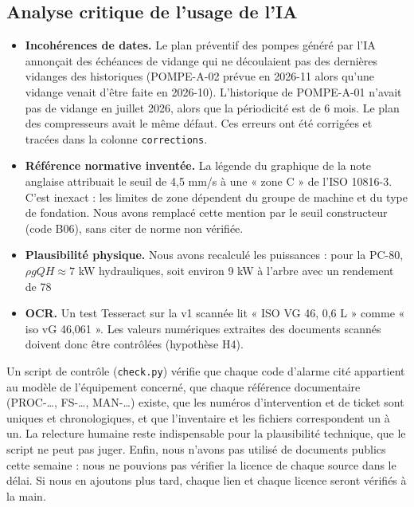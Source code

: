 \documentclass[11pt,a4paper]{article}
\begin{document}
\subsection{Analyse critique de l'usage de l'IA}
\begin{alerte}
\begin{itemize}
\item \textbf{Incohérences de dates.} Le plan préventif des pompes généré par l'IA annonçait des échéances de vidange qui ne découlaient pas des dernières vidanges des historiques (POMPE-A-02 prévue en 2026-11 alors qu'une vidange venait d'être faite en 2026-10). L'historique de POMPE-A-01 n'avait pas de vidange en juillet 2026, alors que la périodicité est de 6 mois. Le plan des compresseurs avait le même défaut. Ces erreurs ont été corrigées et tracées dans la colonne \texttt{corrections}.
\item \textbf{Référence normative inventée.} La légende du graphique de la note anglaise attribuait le seuil de 4,5 mm/s à une « zone C » de l'ISO 10816-3. C'est inexact : les limites de zone dépendent du groupe de machine et du type de fondation. Nous avons remplacé cette mention par le seuil constructeur (code B06), sans citer de norme non vérifiée.
\item \textbf{Plausibilité physique.} Nous avons recalculé les puissances : pour la PC-80, $\rho g Q H \approx 7$ kW hydrauliques, soit environ 9 kW à l'arbre avec un rendement de 78 %
\item \textbf{OCR.} Un test Tesseract sur la v1 scannée lit « ISO VG 46, 0,6 L » comme « iso vG 46,061 ». Les valeurs numériques extraites des documents scannés doivent donc être contrôlées (hypothèse H4).
\end{itemize}
\end{alerte}
Un script de contrôle (\texttt{check.py}) vérifie que chaque code d'alarme cité appartient au modèle de l'équipement concerné, que chaque référence documentaire (PROC-…, FS-…, MAN-…) existe, que les numéros d'intervention et de ticket sont uniques et chronologiques, et que l'inventaire et les fichiers correspondent un à un. La relecture humaine reste indispensable pour la plausibilité technique, que le script ne peut pas juger. Enfin, nous n'avons pas utilisé de documents publics cette semaine : nous ne pouvions pas vérifier la licence de chaque source dans le délai. Si nous en ajoutons plus tard, chaque lien et chaque licence seront vérifiés à la main.
\end{document}
